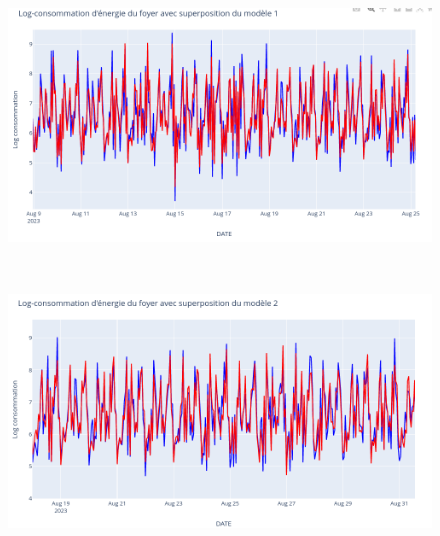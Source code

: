 \documentclass{beamer}
\theoremstyle{definition}
\begin{document}
\begin{frame}
	\begin{figure}
		\centering
		\begin{minipage}{\linewidth}
			\centering
			\includegraphics[width=0.65\linewidth]{24.png}
		\end{minipage}
		\\
		\begin{minipage}{\linewidth}
			\centering
			\includegraphics[width=0.65\linewidth]{25.png}
		\end{minipage}
	\end{figure}
\end{frame}
\end{document}
